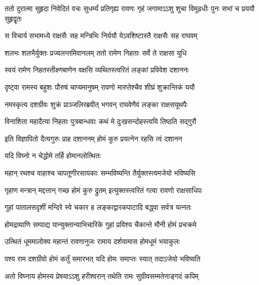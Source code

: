 \fourlineindentedshloka
{ततो दुरात्मा सुहृदा निवेदितं}
{वचः सुधर्म्यं प्रतिगृह्य रावणः}
{गृहं जगामाऽऽशु शुचा विमूढधीः}
{पुनः सभां च प्रययौ सुहृद्वृतः} %






\twolineshloka
{स विचार्य सभामध्ये राक्षसैः सह मन्त्रिभिः}
{निर्ययौ येऽवशिष्टास्तै राक्षसैः सह राघवम्} %

\twolineshloka
{शलभः शलभैर्युक्तः प्रज्वलन्तमिवानलम्}
{ततो रामेण निहताः सर्वे ते राक्षसा युधि} %

\twolineshloka
{स्वयं रामेण निहतस्तीक्ष्णबाणेन वक्षसि}
{व्यथितस्त्वरितं लङ्कां प्रविवेश दशाननः} %

\twolineshloka
{दृष्ट्वा रामस्य बहुशः पौरुषं चाप्यमानुषम्}
{रावणो मारुतेश्चैव शीघ्रं शुक्रान्तिकं ययौ} %

\twolineshloka
{नमस्कृत्य दशग्रीवः शुक्रं प्राञ्जलिरब्रवीत्}
{भगवन् राघवेणैवं लङ्का राक्षसयूथपैः} %

\twolineshloka
{विनाशिता महादैत्या निहताः पुत्रबान्धवाः}
{कथं मे दुःखसन्दोहस्त्वयि तिष्ठति सद्गुरौ} %

\twolineshloka
{इति विज्ञापितो दैत्यगुरुः प्राह दशाननम्}
{होमं कुरु प्रयत्नेन रहसि त्वं दशानन} %

{यदि विघ्नो न चेद्धोमे तर्हि होमानलोत्थितः} %


\twolineshloka
{महान् रथश्च वाहाश्च चापतूणीरसायकाः}
{सम्भविष्यन्ति तैर्युक्तस्त्वमजेयो भविष्यसि} %

\twolineshloka
{गृहाण मन्त्रान् मद्दत्तान् गच्छ होमं कुरु द्रुतम्}
{इत्युक्तस्त्वरितं गत्वा रावणो राक्षसाधिपः} %

\twolineshloka
{गुहां पातालसदृशीं मन्दिरे स्वे चकार ह}
{लङ्काद्वारकपाटादि बद्\mbox{}ध्वा सर्वत्र यत्नतः} %

\twolineshloka
{होमद्रव्याणि सम्पाद्य यान्युक्तान्याभिचारिके}
{गुहां प्रविश्य चैकान्ते मौनी होमं प्रचक्रमे} %

\twolineshloka
{उत्थितं धूममालोक्य महान्तं रावणानुजः}
{रामाय दर्शयामास होमधूमं भयाकुलः} %

\twolineshloka
{पश्य राम दशग्रीवो होमं कर्तुं समारभत्}
{यदि होमः समाप्तः स्यात् तदाऽजेयो भविष्यति} %

\twolineshloka
{अतो विघ्नाय होमस्य प्रेषयाऽऽशु हरीश्वरान्}
{तथेति रामः सुग्रीवसम्मतेनाङ्गदं कपिम्} %

